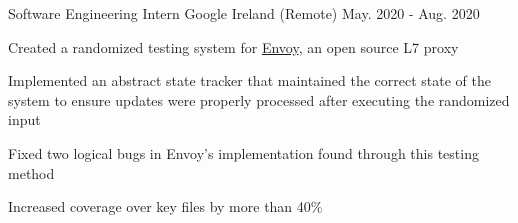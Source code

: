 \begin{cventries}
  \cventry
    {Software Engineering Intern}
    {Google}
    {Ireland (Remote)}
    {May. 2020 - Aug. 2020}
    {
      \begin{cvitems}
        \item Created a randomized testing system for \href{https://github.com/envoyproxy/envoy}{Envoy}, an open source L7 proxy
        \item Implemented an abstract state tracker that maintained the correct state of the system to ensure updates were properly processed after executing the randomized input
        \item Fixed two logical bugs in Envoy's implementation found through this testing method
        \item Increased coverage over key files by more than 40\%
      \end{cvitems}
    }

\end{cventries}
